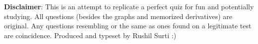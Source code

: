 \documentclass{exam}
\begin{document}
\vspace{5mm}


\vspace{5mm}


\vspace{5mm}

\footnotesize \textbf{Disclaimer}: This is an attempt to replicate a perfect quiz for fun and potentially studying. All questions (besides the graphs and memorized derivatives) are original. Any questions resembling or the same as ones found on a legitimate test are coincidence. Produced and typeset by Rushil Surti :)

\normalsize
\end{document}
